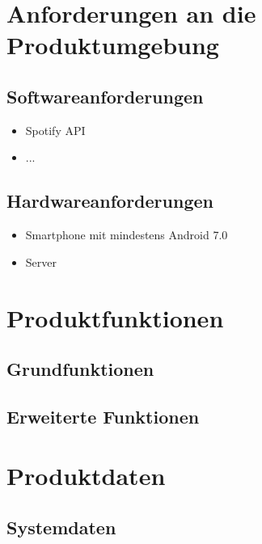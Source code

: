 \documentclass[oneside, ngerman]{sdqtechreport}
\begin{document}
\chapter{Anforderungen an die Produktumgebung}
\label{chap:Produktumgebung}

\section{Softwareanforderungen}
\label{sec:Produktumgebung:Softwareanforderungen}

\begin{itemize}
    \item Spotify API
    \item ...
\end{itemize}

\section{Hardwareanforderungen}
\label{sec:Produktumgebung:Hardwareanforderungen}

\begin{itemize}
    \item Smartphone mit mindestens Android 7.0
    \item Server
\end{itemize}



\chapter{Produktfunktionen}
\label{chap:Produktfunktionen}

\section{Grundfunktionen}
\label{sec:Produktfunktionen:Software}

\section{Erweiterte Funktionen}
\label{sec:Produktfunktionen:Hardware}



\chapter{Produktdaten}
\label{chap:Produktdaten}

\section{Systemdaten}
\label{sec:Produktdaten:Systemdaten}
\end{document}
